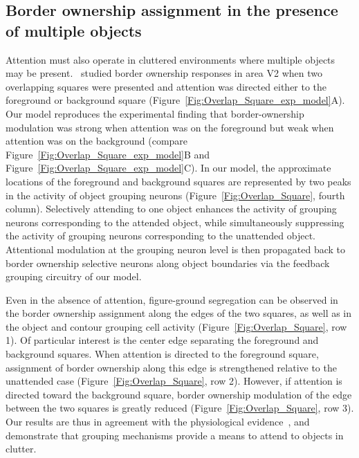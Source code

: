 \subsection{Border ownership assignment in the presence of multiple objects}
\label{sec:BOS_overlap}
Attention must also operate in cluttered environments where multiple
objects may be present.~\cite{Qiu_etal07} studied border ownership
responses in area V2 when two overlapping squares were presented and
attention was directed either to the foreground or background square
(Figure~\ref{Fig:Overlap_Square_exp_model}A). Our model reproduces the experimental finding that  border-ownership modulation was strong when attention was on the
  foreground but weak when attention was on the background (compare Figure~\ref{Fig:Overlap_Square_exp_model}B and Figure~\ref{Fig:Overlap_Square_exp_model}C).
In our model, the approximate locations of the foreground and background squares are represented by two peaks in the activity of object grouping neurons (Figure~\ref{Fig:Overlap_Square}, fourth column). Selectively attending to one object enhances the activity of grouping neurons corresponding to the attended object, while simultaneously suppressing the activity of grouping neurons corresponding to the unattended object. Attentional modulation at the grouping neuron level is then propagated back to border ownership selective neurons along object boundaries via the feedback grouping circuitry of our model.

 Even in the absence of attention, figure-ground segregation can be observed in the border ownership
assignment along the edges of the two squares, as well as in the
object and contour grouping cell activity
(Figure~\ref{Fig:Overlap_Square}, row 1). 
Of particular interest is
the center edge separating the foreground and background squares. When
attention is directed to the foreground square, assignment of border
ownership along this edge is strengthened
relative to the unattended case
(Figure~\ref{Fig:Overlap_Square}, row 2).
 However, if attention is
directed toward the background square, border ownership modulation of
the edge between the two squares is greatly reduced
(Figure~\ref{Fig:Overlap_Square}, row 3). 
Our results are thus in agreement
with the physiological evidence~\citep{Qiu_etal07}, and demonstrate
that grouping mechanisms provide a means to attend to objects in
clutter. 

